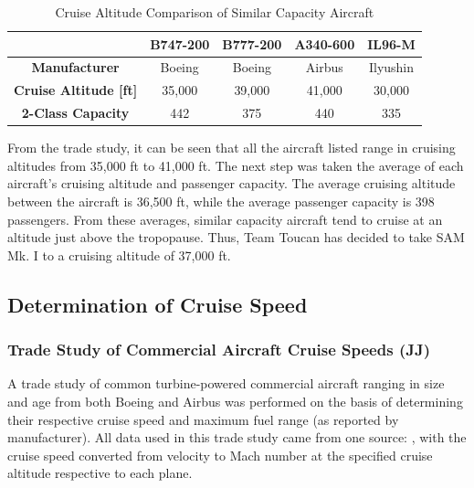 \begin{table}[!h]
    \centering
        \caption{Cruise Altitude Comparison of Similar Capacity Aircraft}
    \begin{tabular}{|c||c|c|c|c|}\toprule
         & \textbf{B747-200} & \textbf{B777-200} & \textbf{A340-600} & \textbf{IL96-M}\\ \hline
         \textbf{Manufacturer} & Boeing & Boeing & Airbus & Ilyushin \\ \hline
         \textbf{Cruise Altitude [ft]} &  35,000 & 39,000 & 41,000 & 30,000 \\ \hline
         \textbf{2-Class Capacity} & 442 & 375 & 440 & 335\\ \bottomrule
    \end{tabular}
    \label{cruxalt}
\end{table}

From the trade study, it can be seen that all the aircraft listed range in cruising altitudes from 35,000 ft to 41,000 ft. The next step was taken the average of each aircraft's cruising altitude and passenger capacity. The average cruising altitude between the aircraft is 36,500 ft, while the average passenger capacity is 398 passengers. From these averages, similar capacity aircraft tend to cruise at an altitude just above the tropopause. Thus, Team Toucan has decided to take SAM Mk. I to a cruising altitude of 37,000 ft.

\subsection{Determination of Cruise Speed}
\label{crusspeed}
\subsubsection{Trade Study of Commercial Aircraft Cruise Speeds (JJ)}
A trade study of common turbine-powered commercial aircraft ranging in size and age from both Boeing and Airbus was performed on the basis of determining their respective cruise speed and maximum fuel range (as reported by manufacturer).  All data used in this trade study came from one source:  \cite{butterworth}, with the cruise speed converted from velocity to Mach number at the specified cruise altitude respective to each plane. 

